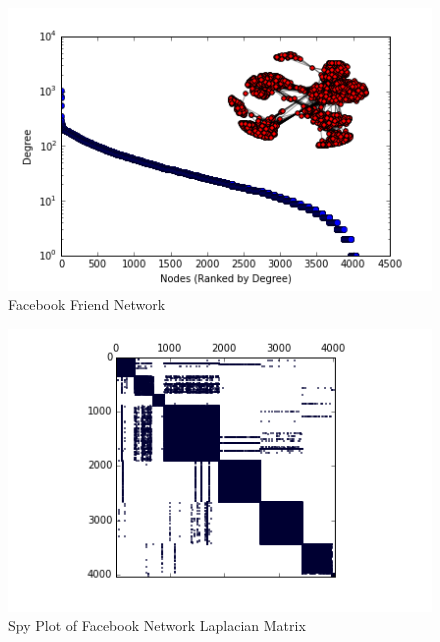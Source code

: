 \documentclass{article}
\begin{document}
\begin{figure}
\centering

\includegraphics[width=\linewidth]{fb_degree_histogram.png}
\caption{Facebook Friend Network \cite{Mcauley:2012}}
  
\end{figure}

\begin{figure}
\centering
\includegraphics[width = \linewidth]{fbspy.png}
\caption{Spy Plot of Facebook Network Laplacian Matrix}
\end{figure}
\end{document}
